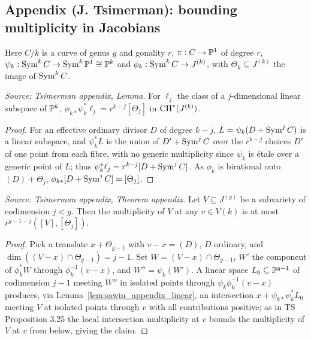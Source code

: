\subsection{Appendix (J. Tsimerman): bounding multiplicity in Jacobians}

Here $C/k$ is a curve of genus $g$ and gonality $r$, $\pi:C\to\mathbb{P}^1$ of degree
$r$, $\psi_k:\operatorname{Sym}^k C\to\operatorname{Sym}^k\mathbb{P}^1\cong\mathbb{P}^k$ and $\phi_k:\operatorname{Sym}^k C\to J^{(k)}$,
with $\Theta_k\subseteq J^{(k)}$ the image of $\operatorname{Sym}^k C$.

\begin{lemma}
  \label{lem:sawin_appendix_linear}
  \textit{Source: Tsimerman appendix, Lemma.}
  For $\ell_j$ the class of a $j$-dimensional linear subspace of $\mathbb{P}^k$,
  $\phi_{k*}\psi_k^*\ell_j = r^{k-j}[\Theta_j]$ in $\operatorname{CH}^*(J^{(k)})$.
\end{lemma}
\begin{proof}
  For an effective ordinary divisor $D$ of degree $k-j$, $L=\psi_k(D+\operatorname{Sym}^j C)$ is
  a linear subspace, and $\psi_k^*L$ is the union of $D'+\operatorname{Sym}^j C$ over the
  $r^{k-j}$ choices $D'$ of one point from each fibre, with no generic
  multiplicity since $\psi_k$ is étale over a generic point of $L$; thus
  $\psi_k^*\ell_j=r^{k-j}[D+\operatorname{Sym}^j C]$.  As $\phi_k$ is birational onto
  $(D)+\Theta_j$, $\phi_{k*}[D+\operatorname{Sym}^j C]=[\Theta_j]$.
\end{proof}

\begin{theorem}
  \label{thm:sawin_appendix}
  \textit{Source: Tsimerman appendix, Theorem appendix.}
  Let $V\subseteq J^{(g)}$ be a subvariety of codimension $j<g$.  Then the
  multiplicity of $V$ at any $v\in V(k)$ is at most $r^{g-1-j}([V],[\Theta_j])$.
\end{theorem}
\begin{proof}
  Pick a translate $x+\Theta_{g-1}$ with $v-x=(D)$, $D$ ordinary, and
  $\dim((V-x)\cap\Theta_{g-1})=j-1$.  Set $W=(V-x)\cap\Theta_{g-1}$, $W'$ the
  component of $\phi_k^*W$ through $\phi_k^{-1}(v-x)$, and $W''=\psi_k(W')$.  A
  linear space $L_0\subseteq\mathbb{P}^{g-1}$ of codimension $j-1$ meeting $W''$ in
  isolated points through $\psi_k\phi_k^{-1}(v-x)$ produces, via
  Lemma~\ref{lem:sawin_appendix_linear}, an intersection
  $x+\psi_{k*}\psi_k^*L_0$ meeting $V$ at isolated points through $v$ with all
  contributions positive; as in TS Proposition 3.25 the local intersection
  multiplicity at $v$ bounds the multiplicity of $V$ at $v$ from below, giving the
  claim.
\end{proof}
